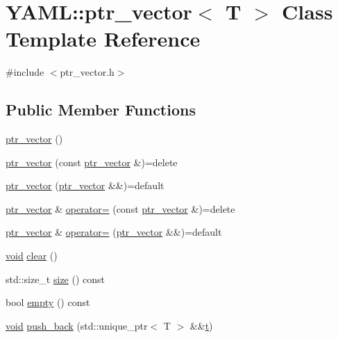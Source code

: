 \hypertarget{class_y_a_m_l_1_1ptr__vector}{}\section{Y\+A\+ML\+::ptr\+\_\+vector$<$ T $>$ Class Template Reference}
\label{class_y_a_m_l_1_1ptr__vector}


{\ttfamily \#include $<$ptr\+\_\+vector.\+h$>$}

\subsection*{Public Member Functions}
\begin{DoxyCompactItemize}
\item 
\mbox{\hyperlink{class_y_a_m_l_1_1ptr__vector_ae42ba97dcff66ca160a55ad2b7bc3009}{ptr\+\_\+vector}} ()
\item 
\mbox{\hyperlink{class_y_a_m_l_1_1ptr__vector_a2249c8dd5ba06a7e26e8d25340e215b2}{ptr\+\_\+vector}} (const \mbox{\hyperlink{class_y_a_m_l_1_1ptr__vector}{ptr\+\_\+vector}} \&)=delete
\item 
\mbox{\hyperlink{class_y_a_m_l_1_1ptr__vector_a3fc1364eda0a9b01752ef570c12bf326}{ptr\+\_\+vector}} (\mbox{\hyperlink{class_y_a_m_l_1_1ptr__vector}{ptr\+\_\+vector}} \&\&)=default
\item 
\mbox{\hyperlink{class_y_a_m_l_1_1ptr__vector}{ptr\+\_\+vector}} \& \mbox{\hyperlink{class_y_a_m_l_1_1ptr__vector_a2d14a364d345f9eda55eb7c39fd98918}{operator=}} (const \mbox{\hyperlink{class_y_a_m_l_1_1ptr__vector}{ptr\+\_\+vector}} \&)=delete
\item 
\mbox{\hyperlink{class_y_a_m_l_1_1ptr__vector}{ptr\+\_\+vector}} \& \mbox{\hyperlink{class_y_a_m_l_1_1ptr__vector_aadba46b0ec923d44cdb07a2ff2773b1e}{operator=}} (\mbox{\hyperlink{class_y_a_m_l_1_1ptr__vector}{ptr\+\_\+vector}} \&\&)=default
\item 
\mbox{\hyperlink{glad_8h_a950fc91edb4504f62f1c577bf4727c29}{void}} \mbox{\hyperlink{class_y_a_m_l_1_1ptr__vector_a7ee95eb6be5454a6ba9031387c8881de}{clear}} ()
\item 
std\+::size\+\_\+t \mbox{\hyperlink{class_y_a_m_l_1_1ptr__vector_a4e3ff811626d9436a768db19bfc515eb}{size}} () const
\item 
bool \mbox{\hyperlink{class_y_a_m_l_1_1ptr__vector_a9ee7d7961a73ce06dcfa08f3e02a25ee}{empty}} () const
\item 
\mbox{\hyperlink{glad_8h_a950fc91edb4504f62f1c577bf4727c29}{void}} \mbox{\hyperlink{class_y_a_m_l_1_1ptr__vector_a45d56913599355615236efdb7a1b7f56}{push\+\_\+back}} (std\+::unique\+\_\+ptr$<$ T $>$ \&\&\mbox{\hyperlink{glad_8h_aef9f00bf06d58b8db7e501e287488401}{t}})

\end{DoxyCompactItemize}
